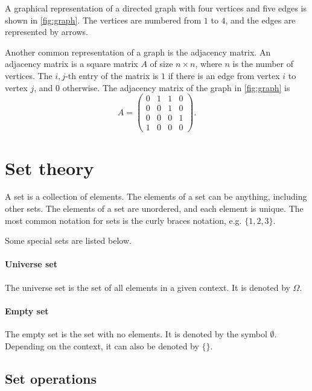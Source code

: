 A graphical representation of a directed graph with four vertices and five edges is shown
in \cref{fig:graph}.  The vertices are numbered from $1$ to $4$, and the edges are
represented by arrows.

Another common representation of a graph is the adjacency matrix.  An adjacency matrix is
a square matrix $A$ of size $n \times n$, where $n$ is the number of vertices.  The
$i, j$-th entry of the matrix is $1$ if there is an edge from vertex $i$ to vertex $j$,
and $0$ otherwise.  The adjacency matrix of the graph in \cref{fig:graph} is
\[
  A = \begin{pmatrix}
    0 & 1 & 1 & 0 \\
    0 & 0 & 1 & 0 \\
    0 & 0 & 0 & 1 \\
    1 & 0 & 0 & 0
  \end{pmatrix}\text{.}
\]


\section{Set theory}

A set is a collection of elements.  The elements of a set can be anything, including
other sets.  The elements of a set are unordered, and each element is unique.  The
most common notation for sets is the curly braces notation, e.g. $\{1, 2, 3\}$.

Some special sets are listed below.

\paragraph{Universe set}  The universe set is the set of all elements in a given context.
It is denoted by $\Omega$.

\paragraph{Empty set}  The empty set is the set with no elements.  It is denoted by
the symbol $\emptyset$.  Depending on the context, it can also be denoted by $\{\}$.

\subsection{Set operations}

